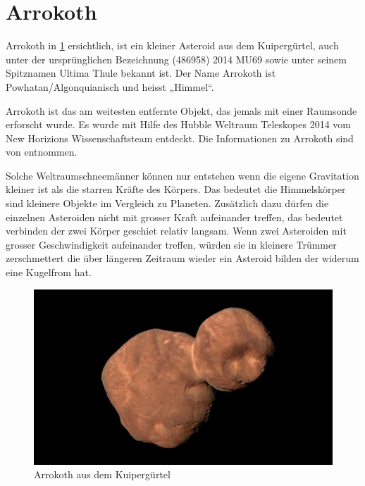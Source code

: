 %
%
%
%
\section{Arrokoth
\label{planet:section:arrokoth}}

Arrokoth in \cref{planet:fig:arrokoth} ersichtlich, ist ein kleiner Asteroid aus dem Kuipergürtel, auch unter der ursprünglichen Bezeichnung (486958) 2014 MU69 sowie unter seinem Spitznamen Ultima Thule bekannt ist.
Der Name Arrokoth ist Powhatan/Algonquianisch und heisst „Himmel“.

Arrokoth ist das am weitesten entfernte Objekt, das jemals mit einer Raumsonde erforscht wurde.
Es wurde mit Hilfe des Hubble Weltraum Teleskopes 2014 vom New Horizions Wissenschaftsteam entdeckt.
Die Informationen zu Arrokoth sind von \cite{planet:arrokoth} entnommen.

Solche Weltraumschneemänner können nur entstehen wenn die eigene Gravitation kleiner ist als die starren Kräfte des Körpers.
Das bedeutet die Himmelskörper sind kleinere Objekte im Vergleich zu Planeten.
Zusätzlich dazu dürfen die einzelnen Asteroiden nicht mit grosser Kraft aufeinander treffen, das bedeutet verbinden der zwei Körper geschiet relativ langsam.
Wenn zwei Asteroiden mit grosser Geschwindigkeit aufeinander treffen, würden sie in kleinere Trümmer zerschmettert die über längeren Zeitraum wieder ein Asteroid bilden der widerum eine Kugelfrom hat.

\begin{figure}[h]
    \centering
    \includegraphics[width=\linewidth]{papers/planet/pictures/Arrokoth.pdf}
    \caption{Arrokoth aus dem Kuipergürtel \cite{planet:arrokothpic}
        \label{planet:fig:arrokoth}}
\end{figure}